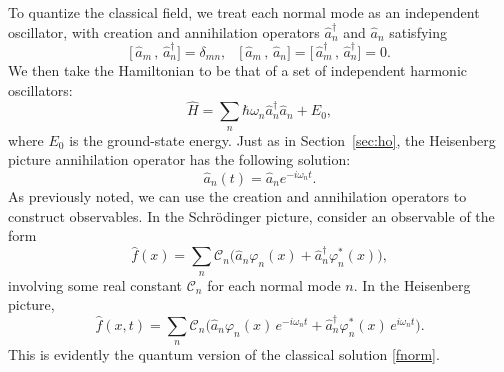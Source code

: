 \documentclass[prx,12pt]{revtex4-2}
\begin{document}
To quantize the classical field, we treat each normal mode as an
independent oscillator, with creation and annihilation operators
$\hat{a}_n^\dagger$ and $\hat{a}_n$ satisfying
\begin{equation}
  \big[\,\hat{a}_m\,,\, \hat{a}_n^\dagger\big] = \delta_{mn}, \;\;\;
  \big[\,\hat{a}_m\,,\, \hat{a}_n\big] =
  \big[\,\hat{a}_m^\dagger\,,\, \hat{a}_n^\dagger\big] = 0.
\end{equation}
We then take the Hamiltonian to be that of a set of independent
harmonic oscillators:
\begin{equation}
  \hat{H} = \sum_n \hbar \omega_n \hat{a}_n^\dagger \hat{a}_n + E_0,
\end{equation}
where $E_0$ is the ground-state energy.  Just as in
Section~\ref{sec:ho}, the Heisenberg picture annihilation operator has
the following solution:
\begin{equation}
  \hat{a}_n(t) = \hat{a}_n e^{-i\omega_n t}.
\end{equation}
As previously noted, we can use the creation and annihilation
operators to construct observables.  In the Schr\"odinger picture,
consider an observable of the form
\begin{equation}
  \hat{f}(x) = \sum_n \mathcal{C}_n \Big(\hat{a}_n \varphi_n(x)
  + \hat{a}_n^\dagger \varphi_n^*(x) \Big),
\end{equation}
involving some real constant $\mathcal{C}_n$ for each normal mode $n$.
In the Heisenberg picture,
\begin{equation}
  \hat{f}(x,t) = \sum_n \mathcal{C}_n \Big(\hat{a}_n \varphi_n(x) \,e^{-i\omega_nt}
  + \hat{a}_n^\dagger \varphi_n^*(x) \, e^{i\omega_nt} \Big).
  \label{fxt}
\end{equation}
This is evidently the quantum version of the classical solution
\eqref{fnorm}.
\end{document}
